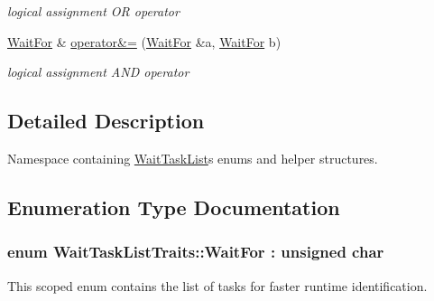 \begin{DoxyCompactItemize}
\begin{DoxyCompactList}\small\item\em logical assignment O\+R operator \end{DoxyCompactList}\item 
\hypertarget{namespace_wait_task_list_traits_a548dc243d47ac061fed8d9bbcda095b7}{}\hyperlink{namespace_wait_task_list_traits_a3cb74ee1929f03e51486087ef21caf9f}{Wait\+For} \& \hyperlink{namespace_wait_task_list_traits_a548dc243d47ac061fed8d9bbcda095b7}{operator\&=} (\hyperlink{namespace_wait_task_list_traits_a3cb74ee1929f03e51486087ef21caf9f}{Wait\+For} \&a, \hyperlink{namespace_wait_task_list_traits_a3cb74ee1929f03e51486087ef21caf9f}{Wait\+For} b)\label{namespace_wait_task_list_traits_a548dc243d47ac061fed8d9bbcda095b7}

\begin{DoxyCompactList}\small\item\em logical assignment A\+N\+D operator \end{DoxyCompactList}\end{DoxyCompactItemize}


\subsection{Detailed Description}
Namespace containing \hyperlink{class_wait_task_list}{Wait\+Task\+List}\textquotesingle{}s enums and helper structures. 

\subsection{Enumeration Type Documentation}
\hypertarget{namespace_wait_task_list_traits_a3cb74ee1929f03e51486087ef21caf9f}{}
\subsubsection[{Wait\+For}]{\setlength{\rightskip}{0pt plus 5cm}enum {\bf Wait\+Task\+List\+Traits\+::\+Wait\+For} \+: unsigned char\hspace{0.3cm}{\ttfamily [strong]}}\label{namespace_wait_task_list_traits_a3cb74ee1929f03e51486087ef21caf9f}


This scoped enum contains the list of tasks for faster runtime identification. 

